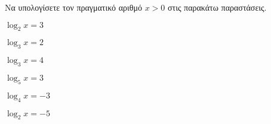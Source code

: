 Να υπολογίσετε τον πραγματικό αριθμό $ x>0 $ στις παρακάτω παραστάσεις.
\begin{multicols}{2}
\begin{rlist}
\item $ \log_{2}{x}=3 $
\item $ \log_{3}{x}=2 $
\item $ \log_{3}{x}=4 $
\item $ \log_{5}{x}=3 $
\item $ \log_{4}{x}=-3 $
\item $ \log_{2}{x}=-5 $
\end{rlist}
\end{multicols}
